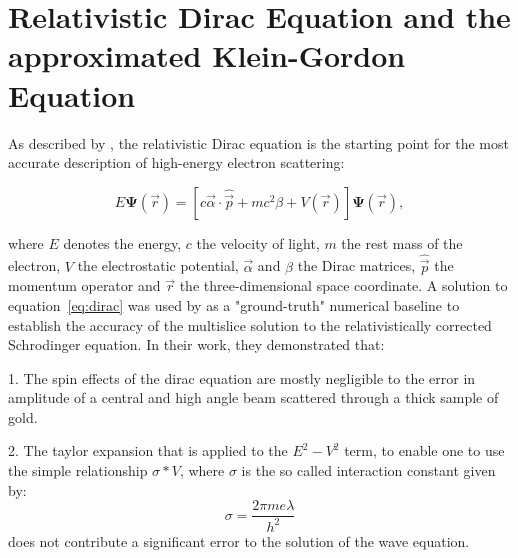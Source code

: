 \documentclass{article}
\begin{document}
\section{Relativistic Dirac Equation and the approximated Klein-Gordon Equation}

As described by \cite{RotherScheerschmidt2009}, the relativistic Dirac equation is the starting point for the most accurate description of high-energy electron scattering:

\begin{equation}
E\boldsymbol{\Psi}(\vec{r}) = [c\vec{\alpha} \cdot \hat{\vec{p}} + mc^2\beta + V(\vec{r})]\boldsymbol{\Psi}(\vec{r}),
\label{eq:dirac}
\end{equation}

where $E$ denotes the energy, $c$ the velocity of light, $m$ the rest mass of the electron, $V$ the electrostatic potential, $\vec{\alpha}$ and $\beta$ the Dirac matrices, 
$\hat{\vec{p}}$ the momentum operator and $\vec{r}$ the three-dimensional space coordinate. A solution to equation~\eqref{eq:dirac} was used by \cite{RotherScheerschmidt2009} 
as a "ground-truth" numerical baseline to establish the accuracy of the multislice solution to the relativistically corrected Schrodinger equation. In their work,
they demonstrated that:

1. The spin effects of the dirac equation are mostly negligible to the error in amplitude of a central and high angle beam scattered through a thick sample of gold.

2. The taylor expansion that is applied to the $E^2 - V^2$ term, to enable one to use the simple relationship $\sigma * V$, 
where $\sigma$ is the so called interaction constant given by: 
$$
\sigma = \frac{2\pi m e \lambda}{h^2}
$$  does not contribute a significant error to the solution of the wave equation. 
\end{document}
